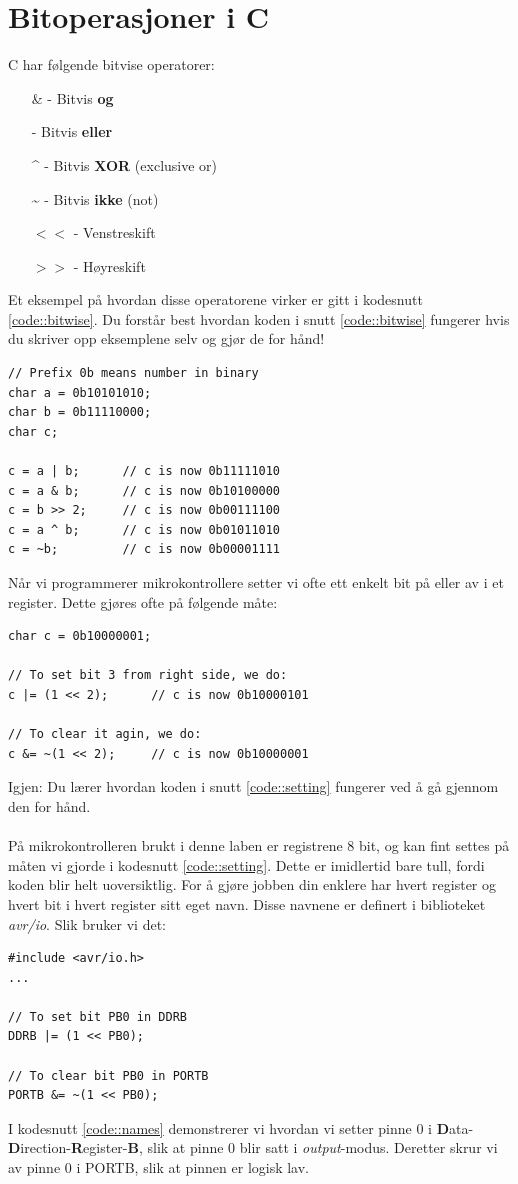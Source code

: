 \documentclass[11pt,a4paper]{article}
\begin{document}
\section{Bitoperasjoner i C}
\label{Bitwise::in::C}
C har følgende bitvise operatorer:
\begin{itemize}
\item[\&] - Bitvis \textbf{og}
\item[\textbar] - Bitvis \textbf{eller}
\item[\textasciicircum] - Bitvis \textbf{XOR} (exclusive or)
\item[\textasciitilde] - Bitvis \textbf{ikke} (not)
\item[$<<$] - Venstreskift
\item[$>>$] - Høyreskift
\end{itemize}
Et eksempel på hvordan disse operatorene virker er gitt i kodesnutt \ref{code::bitwise}. Du forstår best hvordan koden i snutt \ref{code::bitwise} fungerer hvis du skriver opp eksemplene selv og gjør de for hånd!
\begin{lstlisting}[caption=Bitvise operatorer i C.,label=code::bitwise]
// Prefix 0b means number in binary
char a = 0b10101010;
char b = 0b11110000;
char c;

c = a | b;		// c is now 0b11111010
c = a & b;		// c is now 0b10100000
c = b >> 2;		// c is now 0b00111100
c = a ^ b;		// c is now 0b01011010
c = ~b;			// c is now 0b00001111
\end{lstlisting}
Når vi programmerer mikrokontrollere setter vi ofte ett enkelt bit på eller av i et register. Dette gjøres ofte på følgende måte:
\begin{lstlisting}[caption=Setting av enkelte bit.,label=code::setting]
char c = 0b10000001;

// To set bit 3 from right side, we do:
c |= (1 << 2);		// c is now 0b10000101

// To clear it agin, we do:
c &= ~(1 << 2);		// c is now 0b10000001
\end{lstlisting}
Igjen: Du lærer hvordan koden i snutt \ref{code::setting} fungerer ved å gå gjennom den for hånd.\\
\\
På mikrokontrolleren brukt i denne laben er registrene 8 bit, og kan fint settes på måten vi gjorde i kodesnutt \ref{code::setting}. Dette er imidlertid bare tull, fordi koden blir helt uoversiktlig. For å gjøre jobben din enklere har hvert register og hvert bit i hvert register sitt eget navn. Disse navnene er definert i biblioteket \textit{avr/io}. Slik bruker vi det:
\begin{lstlisting}[caption=Bruk av registernavn.,label=code::names]
#include <avr/io.h>
...

// To set bit PB0 in DDRB
DDRB |= (1 << PB0);

// To clear bit PB0 in PORTB
PORTB &= ~(1 << PB0);
\end{lstlisting}
I kodesnutt \ref{code::names} demonstrerer vi hvordan vi setter pinne 0 i \textbf{D}ata-\textbf{D}irection-\textbf{R}egister-\textbf{B}, slik at pinne 0 blir satt i \textit{output}-modus. Deretter skrur vi av pinne 0 i PORTB, slik at pinnen er logisk lav.
\end{document}
